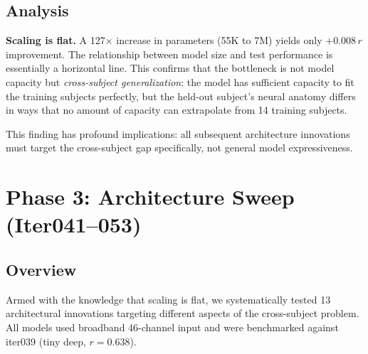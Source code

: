 \documentclass[11pt,a4paper]{article}
\begin{document}
\subsection{Analysis}

\textbf{Scaling is flat.} A 127$\times$ increase in parameters (55K to
7M) yields only $+0.008\,r$ improvement. The relationship between model
size and test performance is essentially a horizontal line. This confirms
that the bottleneck is not model capacity but \emph{cross-subject
generalization}: the model has sufficient capacity to fit the training
subjects perfectly, but the held-out subject's neural anatomy differs in
ways that no amount of capacity can extrapolate from 14 training subjects.

This finding has profound implications: all subsequent architecture
innovations must target the cross-subject gap specifically, not general
model expressiveness.

\section{Phase 3: Architecture Sweep (Iter041--053)}
\label{sec:sweep}

\subsection{Overview}

Armed with the knowledge that scaling is flat, we systematically tested
13 architectural innovations targeting different aspects of the
cross-subject problem. All models used broadband 46-channel input and
were benchmarked against iter039 (tiny deep, $r=0.638$).
\end{document}
